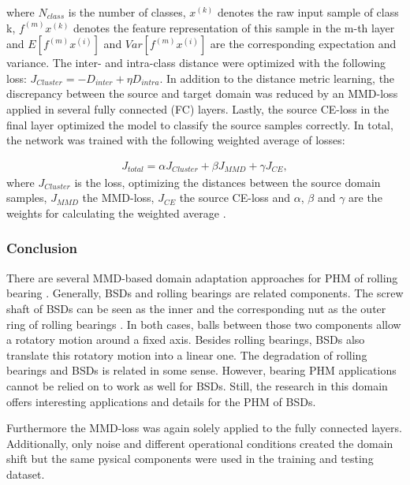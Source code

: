 where $N_{class}$ is the number of classes, $x^{(k)}$ denotes the raw input sample of class k, $f^{(m)}x^{(k)}$ denotes the feature representation of this sample in the m-th layer and $E[f^{(m)}x^{(i)}]$ and $Var[f^{(m)}x^{(i)}]$ are the corresponding expectation and variance. The inter- and intra-class distance were optimized with the following loss: $J_{Cluster} = - D_{inter} + \eta D_{intra}$. In addition to the distance metric learning, the discrepancy between the source and target domain was reduced by an MMD-loss applied in several fully connected (FC) layers. Lastly, the source CE-loss in the final layer optimized the model to classify the source samples correctly. In total, the network was trained with the following weighted average of losses: 

\begin{equation}
    \begin{aligned}
    J_{total} = \alpha J_{Cluster} + \beta J_{MMD} + \gamma J_{CE}, 
    \end{aligned}
\end{equation}
where $J_{Cluster}$ is the loss, optimizing the distances between the source domain samples, $J_{MMD}$ the MMD-loss, $J_{CE}$ the source CE-loss and $\alpha$, $\beta$ and $\gamma$ are the weights for calculating the weighted average \cite{Li2018}.

\subsubsection{Conclusion}
There are several MMD-based domain adaptation approaches for PHM of rolling bearing \cite{AN201942} \cite{Li2018} \cite{Guo2019} \cite{Singh2019} \cite{Kang2020}. Generally, BSDs and rolling bearings are related components. The screw shaft of BSDs can be seen as the inner and the corresponding nut as the outer ring of rolling bearings \cite{Lee2015}. In both cases, balls between those two components allow a rotatory motion around a fixed axis. Besides rolling bearings, BSDs also translate this rotatory motion into a linear one. The degradation of rolling bearings and BSDs is related in some sense. However, bearing PHM applications cannot be relied on to work as well for BSDs. Still, the research in this domain offers interesting applications and details for the PHM of BSDs. 

Furthermore the MMD-loss was again solely applied to the fully connected layers. Additionally, only noise and different operational conditions created the domain shift but the same pysical components were used in the training and testing dataset.

